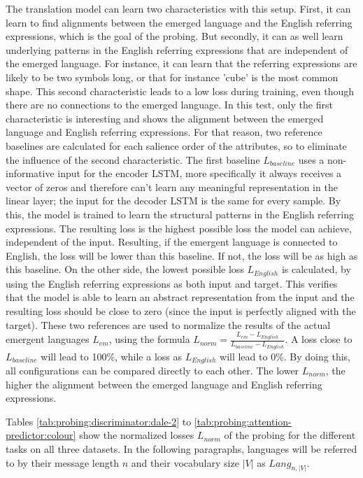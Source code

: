 The translation model can learn two characteristics with this setup.
First, it can learn to find alignments between the emerged language and the English referring expressions, which is the goal of the probing.
But secondly, it can as well learn underlying patterns in the English referring expressions that are independent of the emerged language.
For instance, it can learn that the referring expressions are likely to be two symbols long, or that for instance 'cube' is the most common shape.
This second characteristic leads to a low loss during training, even though there are no connections to the emerged language.
In this test, only the first characteristic is interesting and shows the alignment between the emerged language and English referring expressions.
For that reason, two reference baselines are calculated for each salience order of the attributes, so to eliminate the influence of the second characteristic.
The first baseline $L_{baseline}$ uses a non-informative input for the encoder LSTM, more specifically it always receives a vector of zeros and therefore can't learn any meaningful representation in the linear layer; the input for the decoder LSTM is the same for every sample.
By this, the model is trained to learn the structural patterns in the English referring expressions.
The resulting loss is the highest possible loss the model can achieve, independent of the input.
Resulting, if the emergent language is connected to English, the loss will be lower than this baseline.
If not, the loss will be as high as this baseline.
On the other side, the lowest possible loss $L_{English}$ is calculated, by using the English referring expressions as both input and target.
This verifies that the model is able to learn an abstract representation from the input and the resulting loss should be close to zero (since the input is perfectly aligned with the target).
These two references are used to normalize the results of the actual emergent languages $L_{em}$, using the formula $L_{norm} = \frac{L_{em}-L_{English}}{L_{baseline} - L_{English}}$.
A loss close to $L_{baseline}$ will lead to 100\%, while a loss as $L_{English}$ will lead to 0\%.
By doing this, all configurations can be compared directly to each other.
The lower $L_{norm}$, the higher the alignment between the emerged language and English referring expressions.

Tables \ref{tab:probing:discriminator:dale-2} to \ref{tab:probing:attention-predictor:colour} show the normalized losses $L_{norm}$ of the probing for the different tasks on all three datasets.
In the following paragraphs, languages will be referred to by their message length $n$ and their vocabulary size $|V|$ as $Lang_{n,|V|}$.

